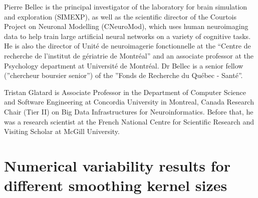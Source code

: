 \documentclass[lettersize,journal]{IEEEtran}
\begin{document}
{\begin{IEEEbiography}{Pierre Bellec}
  is the principal investigator of the laboratory for brain simulation and exploration (SIMEXP), as well as the scientific director of the Courtois Project on Neuronal Modelling (CNeuroMod), which uses human neuroimaging data to help train large artificial neural networks on a variety of cognitive tasks. He is also the director of Unité de neuroimagerie fonctionnelle at the “Centre de recherche de l’institut de gériatrie de Montréal” and an associate professor at the Psychology department at Université de Montréal. Dr Bellec is a senior fellow (”chercheur boursier senior”) of the ”Fonds de Recherche du Québec - Santé”.
\end{IEEEbiography}

\begin{IEEEbiography}{Tristan Glatard} is Associate Professor in the Department of Computer Science and
  Software Engineering at Concordia University in Montreal, Canada
  Research Chair (Tier II) on Big Data Infrastructures for Neuroinformatics.
  Before that, he was a research scientist at the French National Centre for
  Scientific Research and Visiting Scholar at McGill University.
\end{IEEEbiography}

\vfill

\appendix

\section*{Numerical variability results for different smoothing kernel sizes}
\label{appendix:numerical_uncertainty}

}
\end{document}
